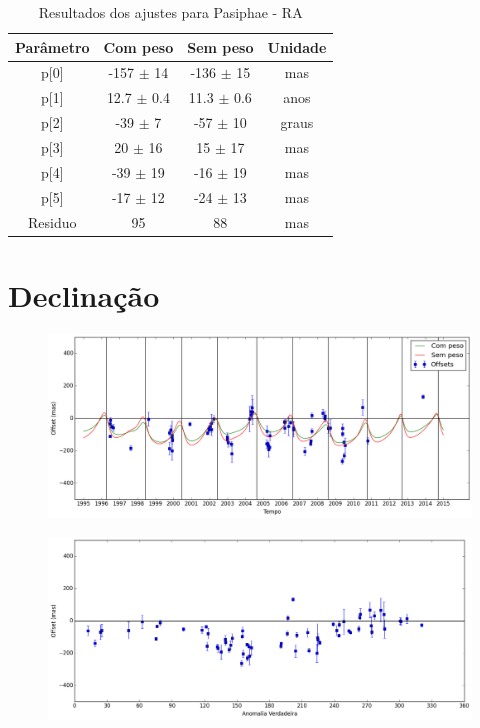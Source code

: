\documentclass[11pt,a4paper]{report}
\begin{document}
\begin{table}[h!]
\caption{\label{Tab: Pasiphae-RA} Resultados dos ajustes para Pasiphae - RA}
\begin{centering}
\begin{tabular}{cccc}
\hline
\hline
Parâmetro & Com peso & Sem peso & Unidade\tabularnewline
\hline
p[0] & -157 $\pm$ 14 & -136 $\pm$ 15 & mas\\
p[1] & 12.7 $\pm$ 0.4 & 11.3 $\pm$ 0.6 & anos\\
p[2] & -39 $\pm$ 7 & -57 $\pm$ 10 & graus\\
p[3] & 20 $\pm$ 16 & 15 $\pm$ 17 & mas\\
p[4] & -39 $\pm$ 19 & -16 $\pm$ 19 & mas\\
p[5] & -17 $\pm$ 12 & -24 $\pm$ 13 & mas\\
Residuo & 95 & 88 & mas\\
\hline 
\end{tabular} 
\par\end{centering}
\end{table}

\section*{Declinação}

\begin{figure}[h]
\includegraphics[scale=0.45]{Pasiphae/DEC.png} 
\end{figure}

\begin{figure}[h]
\includegraphics[scale=0.45]{Pasiphae/DEC_anom.png}  
\end{figure}
\end{document}
